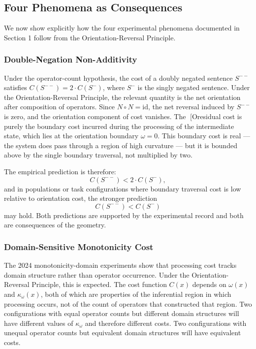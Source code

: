 \documentclass[12pt]{article}
\theoremstyle{remark}
\begin{document}
\subsection{Four Phenomena as Consequences}

We now show explicitly how the four experimental phenomena documented in
Section 1 follow from the Orientation-Reversal Principle.

\subsubsection{Double-Negation Non-Additivity}

Under the operator-count hypothesis, the cost of a doubly negated
sentence $S^{--}$ satisfies $C(S^{--}) = 2 \cdot C(S^-)$, where $S^-$
is the singly negated sentence. Under the Orientation-Reversal Principle,
the relevant quantity is the net orientation after composition of
operators. Since $N \circ N = \mathrm{id}$, the net reversal induced by
$S^{--}$ is zero, and the orientation component of cost vanishes. The
[Oresidual cost is purely the boundary cost incurred during the processing
of the intermediate state, which lies at the orientation boundary
$\omega = 0$. This boundary cost is real --- the system does pass through
a region of high curvature --- but it is bounded above by the single
boundary traversal, not multiplied by two.

The empirical prediction is therefore:
\[
C(S^{--}) < 2 \cdot C(S^-),
\]
and in populations or task configurations where boundary traversal cost
is low relative to orientation cost, the stronger prediction
\[
C(S^{--}) < C(S^-)
\]
may hold. Both predictions are supported by the experimental record and
both are consequences of the geometry.
\subsubsection{Domain-Sensitive Monotonicity Cost}

The 2024 monotonicity-domain experiments show that processing cost tracks
domain structure rather than operator occurrence. Under the
Orientation-Reversal Principle, this is expected. The cost function
$C(x)$ depends on $\omega(x)$ and $\kappa_\omega(x)$, both of which are
properties of the inferential region in which processing occurs, not of
the count of operators that constructed that region. Two configurations
with equal operator counts but different domain structures will have
different values of $\kappa_\omega$ and therefore different costs. Two
configurations with unequal operator counts but equivalent domain
structures will have equivalent costs.
\end{document}
